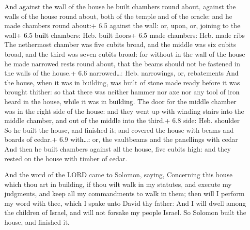  And against the wall of the house he built chambers round
about, against the walls of the house round about, both of the temple
and of the oracle: and he made chambers round about:+ 6.5 against the
wall: or, upon, or, joining to the wall+ 6.5 built chambers: Heb. built
floors+ 6.5 made chambers: Heb. made ribs  The nethermost
chamber was five cubits broad, and the middle was six cubits broad, and
the third was seven cubits broad: for without in the wall of the house
he made narrowed rests round about, that the beams should not be
fastened in the walls of the house.+ 6.6 narrowed\ldots: Heb.
narrowings, or, rebatements  And the house, when it was in
building, was built of stone made ready before it was brought thither:
so that there was neither hammer nor axe nor any tool of iron heard in
the house, while it was in building.  The door for the
middle chamber was in the right side of the house: and they went up with
winding stairs into the middle chamber, and out of the middle into the
third.+ 6.8 side: Heb. shoulder  So he built the house, and
finished it; and covered the house with beams and boards of cedar.+ 6.9
with\ldots: or, the vaultbeams and the panellings with cedar
 And then he built chambers against all the house, five
cubits high: and they rested on the house with timber of cedar.

 And the word of the LORD came to Solomon, saying,
 Concerning this house which thou art in building, if thou
wilt walk in my statutes, and execute my judgments, and keep all my
commandments to walk in them; then will I perform my word with thee,
which I spake unto David thy father:  And I will dwell
among the children of Israel, and will not forsake my people Israel.
 So Solomon built the house, and finished it.

